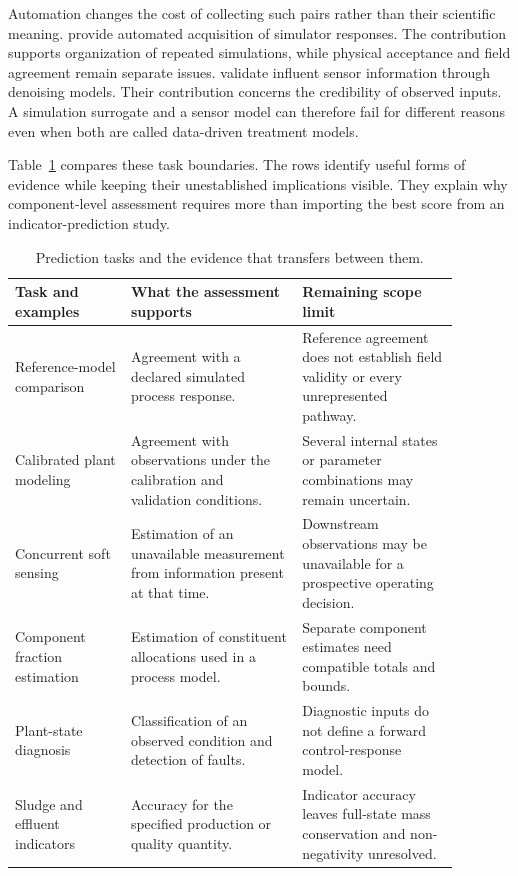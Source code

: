 Automation changes the cost of collecting such pairs rather than their scientific meaning. \citet{Caro2024} provide automated acquisition of simulator responses. The contribution supports organization of repeated simulations, while physical acceptance and field agreement remain separate issues. \citet{BaAlawi2021} validate influent sensor information through denoising models. Their contribution concerns the credibility of observed inputs. A simulation surrogate and a sensor model can therefore fail for different reasons even when both are called data-driven treatment models.

Table~\ref{tab:rrl_prediction_evidence} compares these task boundaries. The rows identify useful forms of evidence while keeping their unestablished implications visible. They explain why component-level assessment requires more than importing the best score from an indicator-prediction study.

\begin{table}[htbp]
\centering\footnotesize
\caption{Prediction tasks and the evidence that transfers between them.}
\label{tab:rrl_prediction_evidence}
\begin{tabular}{>{\raggedright\arraybackslash}p{0.23\linewidth}>{\raggedright\arraybackslash}p{0.34\linewidth}>{\raggedright\arraybackslash}p{0.31\linewidth}}
\toprule Task and examples & What the assessment supports & Remaining scope limit\\\midrule
Reference-model comparison\newline\citep{Calise2020,Henze2006} & Agreement with a declared simulated process response. & Reference agreement does not establish field validity or every unrepresented pathway.\\
Calibrated plant modeling\newline\citep{Meijer2004,SadriMoghaddam2021} & Agreement with observations under the calibration and validation conditions. & Several internal states or parameter combinations may remain uncertain.\\
Concurrent soft sensing\newline\citep{Ching2022} & Estimation of an unavailable measurement from information present at that time. & Downstream observations may be unavailable for a prospective operating decision.\\
Component fraction estimation\newline\citep{Wang2024} & Estimation of constituent allocations used in a process model. & Separate component estimates need compatible totals and bounds.\\
Plant-state diagnosis\newline\citep{Poch1993} & Classification of an observed condition and detection of faults. & Diagnostic inputs do not define a forward control-response model.\\
Sludge and effluent indicators\newline\citep{Ekinci2023,ManavDemir2024} & Accuracy for the specified production or quality quantity. & Indicator accuracy leaves full-state mass conservation and non-negativity unresolved.\\
\bottomrule
\end{tabular}
\end{table}

